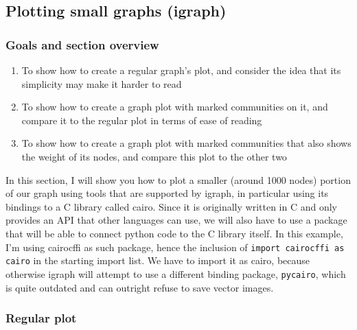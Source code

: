 \documentclass[12pt, a4paper]{article}
\begin{document}
\newpage
\subsection{Plotting small graphs (igraph)}
\subsubsection{Goals and section overview}

\begin{enumerate}
  \item To show how to create a regular graph's plot, and consider the idea that its simplicity may make it harder to read
  \item To show how to create a graph plot with marked communities on it, and compare it to the regular plot in terms of ease of reading
  \item To show how to create a graph plot with marked communities that also shows the weight of its nodes, and compare this plot to the other two
\end{enumerate}


In this section, I will show you how to plot a smaller (around 1000 nodes) portion of our graph using tools that are supported by igraph, in particular using its bindings to a C library called cairo. Since it is originally written in C and only provides an API that other languages can use, we will also have to use a package that will be able to connect python code to the C library itself. In this example, I'm using cairocffi as such package, hence the inclusion of \texttt{import cairocffi as cairo} in the starting import list. We have to import it as cairo, because otherwise igraph will attempt to use a different binding package, \texttt{pycairo}, which is quite outdated and can outright refuse to save vector images.

\subsubsection{Regular plot}
\end{document}
